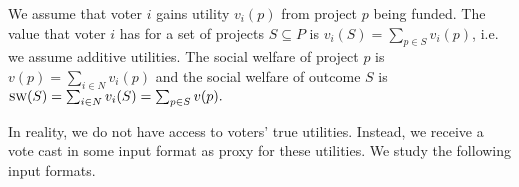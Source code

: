 \documentclass[twoside,11pt]{article}
\newcommand{\sw}{\textsc{sw}}
\newcommand{\voters}{{N}}
\begin{document}
We assume that voter $i$ gains utility $v_i(p)$ from project $p$ being funded. The value that  voter $i$ has for a set of projects $S\subseteq P$ is $v_i(S) = \sum_{p\in S} v_i(p)$, i.e. we assume additive utilities. 
The social welfare of project $p$ is $ v(p) = \sum_{i \in \voters} v_i(p)$ and the social welfare of outcome $S$ is $\sw(S) = \sum_{i\in \voters} v_i(S) = \sum_{p \in S} v(p).$ 

In reality, we do not have access to voters' true utilities. Instead, we receive a vote cast in some input format as proxy for these utilities. We study the following input formats.
\end{document}
